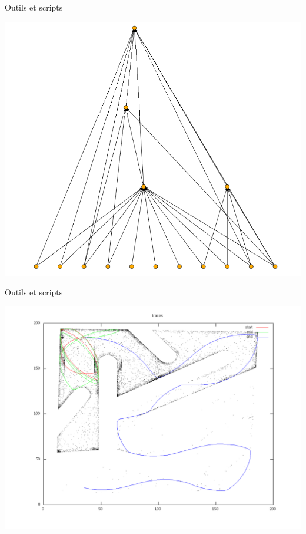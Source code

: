 \documentclass{beamer}
\begin{document}
\begin{frame}{Outils et scripts}
\begin{center}
    \includegraphics[width=.75\linewidth]{images/nnv1}
\end{center}
\end{frame}


\begin{frame}{Outils et scripts}
\begin{center}
    \includegraphics[width=.95\linewidth]{images/traces}
\end{center}
\end{frame}
\end{document}
